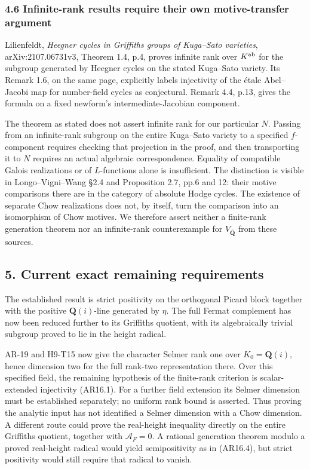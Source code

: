 \subsubsection{4.6 Infinite-rank results require their own
motive-transfer
argument}\label{infinite-rank-results-require-their-own-motive-transfer-argument}

Lilienfeldt, \emph{Heegner cycles in Griffiths groups of Kuga--Sato
varieties}, arXiv:2107.06731v3, Theorem 1.4, p.4, proves infinite rank
over \(K^{\rm ab}\) for the subgroup generated by Heegner cycles on the
stated Kuga--Sato variety. Its Remark 1.6, on the same page, explicitly
labels injectivity of the étale Abel--Jacobi map for number-field cycles
as conjectural. Remark 4.4, p.13, gives the formula on a fixed newform's
intermediate-Jacobian component.

The theorem as stated does not assert infinite rank for our particular
\(N\). Passing from an infinite-rank subgroup on the entire Kuga--Sato
variety to a specified \(f\)-component requires checking that projection
in the proof, and then transporting it to \(N\) requires an actual
algebraic correspondence. Equality of compatible Galois realizations or
of \(L\)-functions alone is insufficient. The distinction is visible in
Longo--Vigni--Wang §2.4 and Proposition 2.7, pp.6 and 12: their motive
comparisons there are in the category of absolute Hodge cycles. The
existence of separate Chow realizations does not, by itself, turn the
comparison into an isomorphism of Chow motives. We therefore assert
neither a finite-rank generation theorem nor an infinite-rank
counterexample for \(V_{\overline{\mathbf Q}}\) from these sources.

\subsection{5. Current exact remaining
requirements}\label{current-exact-remaining-requirements}

The established result is strict positivity on the orthogonal Picard
block together with the positive \(\mathbf Q(i)\)-line generated by
\(\eta\). The full Fermat complement has now been reduced further to its
Griffiths quotient, with its algebraically trivial subgroup proved to
lie in the height radical.

AR-19 and H9-T15 now give the character Selmer rank one over
\(K_0=\mathbf Q(i)\), hence dimension two for the full rank-two
representation there. Over this specified field, the remaining
hypothesis of the finite-rank criterion is scalar-extended injectivity
(AR16.1). For a further field extension its Selmer dimension must be
established separately; no uniform rank bound is asserted. Thus proving
the analytic input has not identified a Selmer dimension with a Chow
dimension. A different route could prove the real-height inequality
directly on the entire Griffiths quotient, together with
\(\mathcal A_F=0\). A rational generation theorem modulo a proved
real-height radical would yield semipositivity as in (AR16.4), but
strict positivity would still require that radical to vanish.

